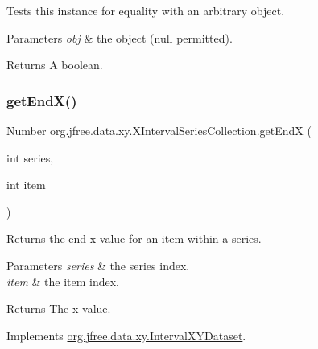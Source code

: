 Tests this instance for equality with an arbitrary object.


\begin{DoxyParams}{Parameters}
{\em obj} & the object ({\ttfamily null} permitted).\\
\hline
\end{DoxyParams}
\begin{DoxyReturn}{Returns}
A boolean. 
\end{DoxyReturn}
\mbox{\label{classorg_1_1jfree_1_1data_1_1xy_1_1_x_interval_series_collection_a1b58332e3a54baab086dd084a77a4c48}} 
\subsubsection{\texorpdfstring{get\+End\+X()}{getEndX()}}
{\footnotesize\ttfamily Number org.\+jfree.\+data.\+xy.\+X\+Interval\+Series\+Collection.\+get\+EndX (\begin{DoxyParamCaption}\item[{int}]{series,  }\item[{int}]{item }\end{DoxyParamCaption})}

Returns the end x-\/value for an item within a series.


\begin{DoxyParams}{Parameters}
{\em series} & the series index. \\
\hline
{\em item} & the item index.\\
\hline
\end{DoxyParams}
\begin{DoxyReturn}{Returns}
The x-\/value. 
\end{DoxyReturn}


Implements \mbox{\hyperlink{interfaceorg_1_1jfree_1_1data_1_1xy_1_1_interval_x_y_dataset_a93161a6d6c1db37cfac030239c62ab0a}{org.\+jfree.\+data.\+xy.\+Interval\+X\+Y\+Dataset}}.

\mbox{\label{classorg_1_1jfree_1_1data_1_1xy_1_1_x_interval_series_collection_a3bcdb47fcb343fb9e117537501457570}} 
